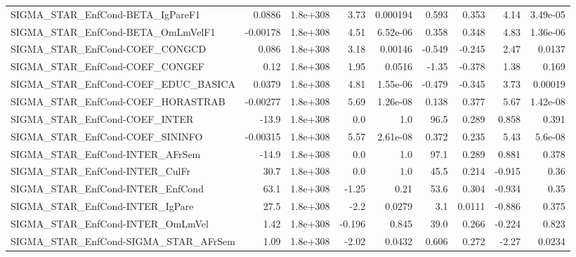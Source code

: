 \begin{tabular}{lrrrrrrrr}
SIGMA\_STAR\_EnfCond-BETA\_IgPareF1      &      0.0886 &     1.8e+308 &    3.73 & 0.000194 &      0.593 &       0.353 &         4.14 &      3.49e-05 \\
SIGMA\_STAR\_EnfCond-BETA\_OmLmVelF1     &    -0.00178 &     1.8e+308 &    4.51 & 6.52e-06 &      0.358 &       0.348 &         4.83 &      1.36e-06 \\
SIGMA\_STAR\_EnfCond-COEF\_CONGCD        &       0.086 &     1.8e+308 &    3.18 &  0.00146 &     -0.549 &      -0.245 &         2.47 &        0.0137 \\
SIGMA\_STAR\_EnfCond-COEF\_CONGEF        &        0.12 &     1.8e+308 &    1.95 &   0.0516 &      -1.35 &      -0.378 &         1.38 &         0.169 \\
SIGMA\_STAR\_EnfCond-COEF\_EDUC\_BASICA   &      0.0379 &     1.8e+308 &    4.81 & 1.55e-06 &     -0.479 &      -0.345 &         3.73 &       0.00019 \\
SIGMA\_STAR\_EnfCond-COEF\_HORASTRAB     &    -0.00277 &     1.8e+308 &    5.69 & 1.26e-08 &      0.138 &       0.377 &         5.67 &      1.42e-08 \\
SIGMA\_STAR\_EnfCond-COEF\_INTER         &       -13.9 &     1.8e+308 &     0.0 &      1.0 &       96.5 &       0.289 &        0.858 &         0.391 \\
SIGMA\_STAR\_EnfCond-COEF\_SININFO       &    -0.00315 &     1.8e+308 &    5.57 & 2.61e-08 &      0.372 &       0.235 &         5.43 &       5.6e-08 \\
SIGMA\_STAR\_EnfCond-INTER\_AFrSem       &       -14.9 &     1.8e+308 &     0.0 &      1.0 &       97.1 &       0.289 &        0.881 &         0.378 \\
SIGMA\_STAR\_EnfCond-INTER\_CulFr        &        30.7 &     1.8e+308 &     0.0 &      1.0 &       45.5 &       0.214 &       -0.915 &          0.36 \\
SIGMA\_STAR\_EnfCond-INTER\_EnfCond      &        63.1 &     1.8e+308 &   -1.25 &     0.21 &       53.6 &       0.304 &       -0.934 &          0.35 \\
SIGMA\_STAR\_EnfCond-INTER\_IgPare       &        27.5 &     1.8e+308 &    -2.2 &   0.0279 &        3.1 &      0.0111 &       -0.886 &         0.375 \\
SIGMA\_STAR\_EnfCond-INTER\_OmLmVel      &        1.42 &     1.8e+308 &  -0.196 &    0.845 &       39.0 &       0.266 &       -0.224 &         0.823 \\
SIGMA\_STAR\_EnfCond-SIGMA\_STAR\_AFrSem  &        1.09 &     1.8e+308 &   -2.02 &   0.0432 &      0.606 &       0.272 &        -2.27 &        0.0234 \\

\end{tabular}
